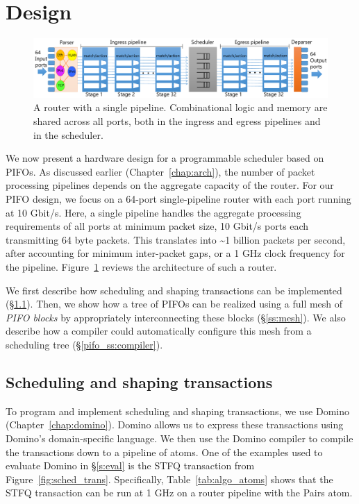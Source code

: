 \section{Design}
\label{s:design}
\begin{figure}
  \centering
  \includegraphics[width=\textwidth]{pifo_router_pipeline.pdf}
  \caption{A router with a single pipeline. Combinational logic and memory are
  shared across all ports, both in the ingress and egress pipelines and in the
  scheduler.}
  \label{pifo_fig:router}
\end{figure}

We now present a hardware design for a programmable scheduler based on PIFOs.
As discussed earlier (Chapter~\ref{chap:arch}), the number of packet processing
pipelines depends on the aggregate capacity of the router. For our PIFO design,
we focus on a 64-port single-pipeline router with each port running at 10
Gbit/s. Here, a single pipeline handles the aggregate processing requirements
of all ports at minimum packet size,  10 Gbit/s ports each transmitting
64 byte packets. This translates into \textasciitilde 1 billion packets per
second, after accounting for minimum inter-packet gaps, or a 1 GHz clock
frequency for the pipeline.  Figure~\ref{pifo_fig:router} reviews the
architecture of such a router.
 
We first describe how scheduling and shaping transactions can be implemented
(\S\ref{ss:transactions}). Then, we show how a tree of PIFOs can be realized
using a full mesh of {\em PIFO blocks} by appropriately interconnecting these
blocks (\S\ref{ss:mesh}). We also describe how a compiler could automatically
configure this mesh from a scheduling tree (\S\ref{pifo_ss:compiler}).

\subsection{Scheduling and shaping transactions}
\label{ss:transactions}
To program and implement scheduling and shaping transactions, we use Domino
(Chapter~\ref{chap:domino}). Domino allows us to express these transactions
using Domino's domain-specific language. We then use the Domino compiler to
compile the transactions down to a pipeline of \absmachine atoms.  One of the
examples used to evaluate Domino in \S\ref{s:eval} is the STFQ transaction from
Figure~\ref{fig:sched_trans}.  Specifically, Table~\ref{tab:algo_atoms} shows
that the STFQ transaction can be run at 1 GHz on a router pipeline with the
Pairs atom.

